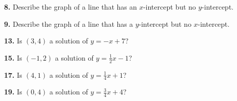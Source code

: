 \documentclass{ximera}
\begin{document}
\begin{problem}
\textbf{8.} Describe the graph of a line that has an $x$-intercept but no $y$-intercept.

\begin{multipleChoice}
\end{multipleChoice}

\end{problem}

\begin{problem}
\textbf{9.} Describe the graph of a line that has a $y$-intercept but no $x$-intercept.

\begin{multipleChoice}
\end{multipleChoice}

\end{problem}

\begin{problem}
\textbf{13.} Is $(3, 4)$ a solution of $y = -x + 7$?

\begin{multipleChoice}
\end{multipleChoice}
\end{problem}

\begin{problem}
\textbf{15.} Is $(-1, 2)$ a solution of $y = \frac{1}{2}x - 1$?

\begin{multipleChoice}
\end{multipleChoice}
\end{problem}

\begin{problem}
\textbf{17.} Is $(4, 1)$ a solution of $y = \frac{1}{4}x + 1$?

\begin{multipleChoice}
\end{multipleChoice}
\end{problem}

\begin{problem}
\textbf{19.} Is $(0, 4)$ a solution of $y = \frac{3}{4}x + 4$?

\begin{multipleChoice}
\end{multipleChoice}
\end{problem}
\end{document}

